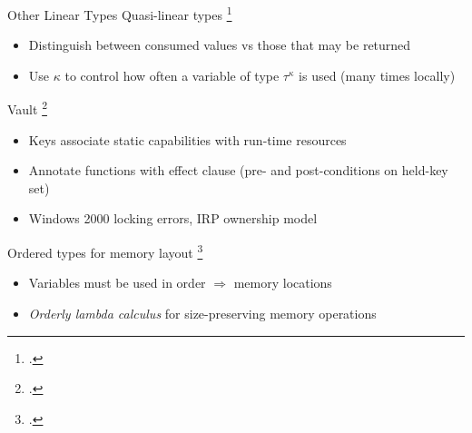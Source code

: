 \documentclass[aspectratio=169]{beamer}
\begin{document}
\begin{frame}{Other Linear Types}
  Quasi-linear types \footcite{kobayashi_quasi-linear_1999} %
    \vspace{-0.09in}
    \begin{itemize}
        \item Distinguish between consumed values vs those that may be returned
        \item Use $\kappa$ to control how often a variable of type $\tau^{\kappa}$ is used (many times locally)
    \end{itemize}
\pause
  Vault \footcite{deline_enforcing_2001} %
    \vspace{-0.09in}
    \begin{itemize}
        \item Keys associate static capabilities with run-time resources %
        \item Annotate functions with effect clause (pre- and post-conditions on held-key set)
        \item Windows 2000 locking errors, IRP ownership model %
    \end{itemize}
\pause
  Ordered types for memory layout \footcite{petersen_type_2003}
    \vspace{-0.09in}
    \begin{itemize}
        \item Variables must be used in order $\Rightarrow$ memory locations  %
        \item \emph{Orderly lambda calculus} for size-preserving memory operations 
    \end{itemize}
  \vspace{0.2in}
\end{frame}

\end{document}
